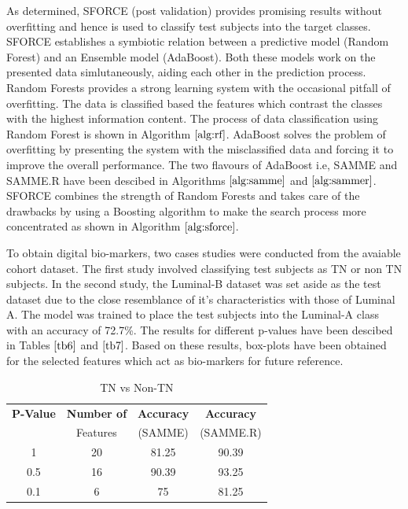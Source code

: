 \documentclass[final,1p,times,twocolumn]{elsarticle}
\begin{document}
As determined, SFORCE (post validation) provides promising results without overfitting and hence is used to classify test subjects into the target classes. SFORCE establishes a symbiotic relation between a predictive model (Random Forest) and an Ensemble model (AdaBoost). Both these models work on the presented data simlutaneously, aiding each other in the prediction process. Random Forests provides a strong learning system with the occasional pitfall of overfitting. The data is classified based the features which contrast the classes with the highest information content. The process of data classification using Random Forest is shown in Algorithm $\ref{alg:rf}$. AdaBoost solves the problem of overfitting by presenting the system with the misclassified data and forcing it to improve the overall performance. The two flavours of AdaBoost i.e, SAMME and SAMME.R have been descibed in Algorithms $\ref{alg:samme}$ and $\ref{alg:sammer}$. SFORCE combines the strength of Random Forests and takes care of the  drawbacks by using a Boosting algorithm to make the search process more concentrated as shown in Algorithm $\ref{alg:sforce}$. 

To obtain digital bio-markers, two cases studies were conducted from the avaiable cohort dataset. The first study involved classifying test subjects as TN or non TN subjects. In the second study, the Luminal-B dataset was set aside as the test dataset due to the close resemblance of it's characteristics with those of Luminal A. The model was trained to place the test subjects into the Luminal-A class with an accuracy of 72.7\%. The results for different p-values have been descibed in Tables $\ref{tb6}$ and $\ref{tb7}$. Based on these results, box-plots have been obtained for the selected features which act as bio-markers for future reference.


\begin{table}[!b]
\scriptsize
\centering
\caption{TN vs Non-TN}
\label{tb6}
\begin{tabular}{| c | c | c | c |}
\hline
\textbf{P-Value} & \textbf{Number of} & \textbf{Accuracy} & \textbf{Accuracy}\\
&Features&(SAMME)&(SAMME.R)\\
\hline
1&20&81.25&90.39\\
\hline
0.5&16&90.39&93.25\\
\hline
0.1&6&75&81.25\\
\hline
\end{tabular}
\end{table}
\end{document}
